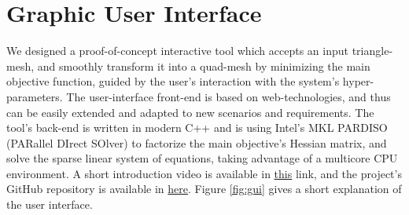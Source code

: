 \section{Graphic User Interface}
We designed a proof-of-concept interactive tool which accepts an input triangle-mesh, and smoothly transform it into a quad-mesh by minimizing the main objective function, guided by the user's interaction with the system's hyper-parameters. The user-interface front-end is based on web-technologies, and thus can be easily extended and adapted to new scenarios and requirements. The tool's back-end is written in modern C++ and is using Intel's MKL PARDISO (PARallel DIrect SOlver) to factorize the main objective's Hessian matrix, and solve the sparse linear system of equations, taking advantage of a multicore CPU environment. A short introduction video is available in  \href{https://youtu.be/1zP5KO8EwHQ}{this} link, and the project's GitHub repository is available in \href{https://github.com/HaifaGraphics/RDS/tree/royv}{here}. Figure \ref{fig:gui} gives a short explanation of the user interface.

